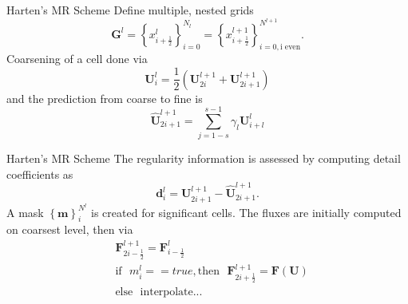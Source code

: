 \documentclass{beamer}
\begin{document}
\begin{frame}{Harten's MR Scheme}
    Define multiple, nested grids
    \begin{equation*}
        \mathbf{G}^{l} = \left\{ x^{l}_{i+\frac{1}{2}} \right\}_{i=0}^{N_{l}} =
            \left\{ x^{l+1}_{i+\frac{1}{2}} \right\}_{i=0,\text{i even}}^{N^{l+1}}.
    \end{equation*}
    Coarsening of a cell done via
    \begin{equation*}
        \mathbf{U}^{l}_{i} = \frac{1}{2} \left( \mathbf{U}^{l+1}_{2i} + \mathbf{U}^{l+1}_{2i+1} \right)
    \end{equation*}
    and the prediction from coarse to fine is
    \begin{equation*}
        \mathbf{\hat{U}}^{l+1}_{2i+1} = \sum_{j=1-s}^{s-1} \gamma_{l} \mathbf{U}^{l}_{i+l}
    \end{equation*}
\end{frame}

\begin{frame}{Harten's MR Scheme}
    The regularity information is assessed by computing detail coefficients as
    \begin{equation*}
        \mathbf{d}^{l}_{i} = \mathbf{U}^{l+1}_{2i+1} - \mathbf{\hat{U}}^{l+1}_{2i+1}.
    \end{equation*}
    A mask $\left\{ \mathbf{m} \right\}_{i}^{N^{l}}$ is created for significant cells. The fluxes are initially computed on
    coarsest level, then via
    \begin{align*}
        & \mathbf{F}^{l+1}_{2i-\frac{1}{2}} = \mathbf{F}^{l}_{i-\frac{1}{2}} \\
        & \text{if} \text{ } m_{i}^{l} == true, \text{then} \text{ } \mathbf{F}^{l+1}_{2i+\frac{1}{2}} = \mathbf{F}(\mathbf{U}) \\
        & \text{else} \text{ } \text{interpolate...}
    \end{align*}
\end{frame}
\end{document}
